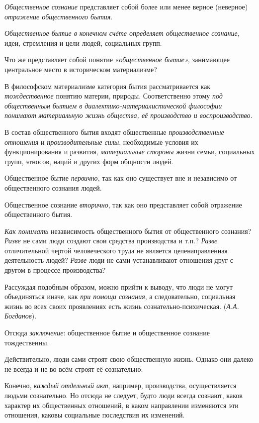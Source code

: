 \documentclass[a4paper,14pt,russian]{extreport}
\begin{document}
\emph{Общественное сознание} представляет собой более или менее верное (неверное) \emph{отражение общественного бытия}.

\emph{Общественное бытие в конечном счёте определяет общественное сознание}, идеи, стремления и цели людей, социальных групп.

Что же представляет собой понятие «\emph{общественное бытие»,} занимающее центральное место в историческом материализме?

В философском материализме категория бытия рассматривается как \emph{тождественное} понятию материи, природы. Соответственно этому \emph{под общественным бытием в диалектико-материалистической философии понимают материальную жизнь общества, её производство и воспроизводство.}

В состав общественного бытия входят общественные \emph{производственные отношения} и \emph{производительные силы}, необходимые условия их функционирования и развития, \emph{материальные стороны} жизни семьи, социальных групп, этносов, наций и других форм общности людей.

Общественное бытие \emph{первично}, так как оно существует вне и независимо от общественного сознания людей.

Общественное сознание \emph{вторично}, так как оно представляет собой отражение общественного бытия.

\emph{Как понимать} независимость общественного бытия от общественного сознания? \emph{Разве} не сами люди создают свои средства производства и т.п.? \emph{Разве} отличительной чертой человеческого труда не является целенаправленная деятельность людей? \emph{Разве} люди не сами устанавливают отношения друг с другом в процессе производства?

Рассуждая подобным образом, можно прийти к выводу, что люди не могут объединяться иначе, как \emph{при помощи сознания}, а следовательно, социальная жизнь во всех своих проявлениях есть жизнь сознательно-психическая. (\emph{А.А. Богданов}).

Отсюда \emph{заключение}: общественное бытие и общественное сознание тождественны.

Действительно, люди сами строят свою общественную жизнь. Однако они далеко не всегда и не во всём строят её сознательно.

Конечно, \emph{каждый отдельный акт}, например, производства, осуществляется людьми сознательно. Но отсюда не следует, будто люди всегда сознают, каков характер их общественных отношений, в каком направлении изменяются эти отношения, каковы социальные последствия их изменений.
\end{document}
